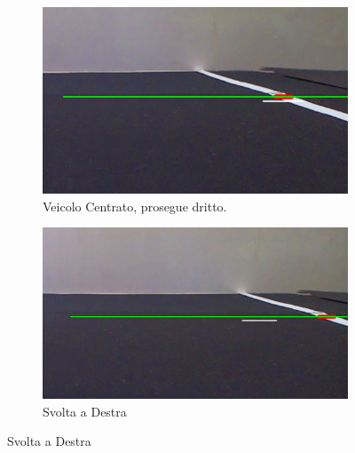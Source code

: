 \documentclass{article}
\begin{document}
\begin{figure}[h!]
    \centering
    \captionsetup[subfigure]{labelformat=parens, labelsep=space}

    \begin{subfigure}[b]{0.7\linewidth}
        \centering
        \includegraphics[width=\linewidth]{img/centro.png}
        \caption{Veicolo Centrato, prosegue dritto.}
        \label{fig:centro}
    \end{subfigure}

    \vspace{0.8em} 

    \begin{subfigure}[b]{0.7\linewidth}
        \centering
        \includegraphics[width=\linewidth]{img/destra.png}
        \caption{Svolta a Destra}
        \label{fig:destra}
    \end{subfigure}

    \vspace{0.8em}


\end{figure}
\end{document}
